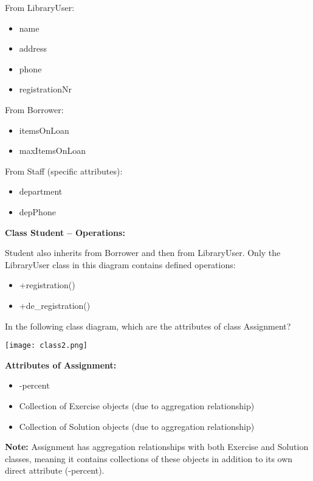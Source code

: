 \documentclass[12pt]{article}
\begin{document}
From LibraryUser:
\begin{itemize}
    \item name
    \item address
    \item phone
    \item registrationNr
\end{itemize}

From Borrower:
\begin{itemize}
    \item itemsOnLoan
    \item maxItemsOnLoan
\end{itemize}

From Staff (specific attributes):
\begin{itemize}
    \item department
    \item depPhone
\end{itemize}

\textbf{Class Student -- Operations:}

Student also inherits from Borrower and then from LibraryUser. Only the LibraryUser class in this diagram contains defined operations:
\begin{itemize}
    \item +registration()
    \item +de\_registration()
\end{itemize}

\begin{questionbox}
In the following class diagram, which are the attributes of class Assignment?

\begin{center}
\texttt{[image: class2.png]}
\end{center}
\end{questionbox}

\textbf{Attributes of Assignment:}
\begin{itemize}
    \item -percent
    \item Collection of Exercise objects (due to aggregation relationship)
    \item Collection of Solution objects (due to aggregation relationship)
\end{itemize}

\textbf{Note:} Assignment has aggregation relationships with both Exercise and Solution classes, meaning it contains collections of these objects in addition to its own direct attribute (-percent).
\end{document}

